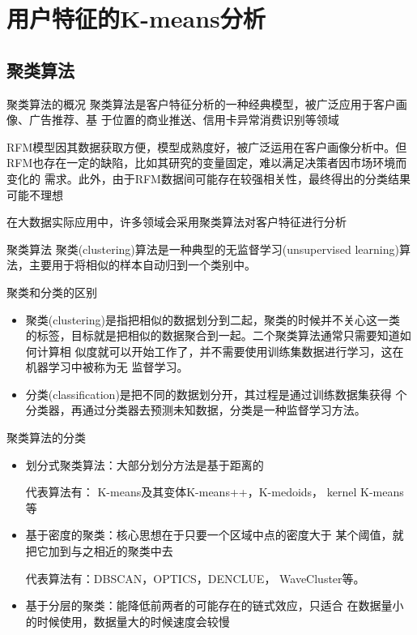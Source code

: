 \documentclass[t]{beamer}
\begin{document}
\section{用户特征的K-means分析}

\subsection{聚类算法}
\begin{frame}[fragile]{聚类算法的概况}
  聚类算法是客户特征分析的一种经典模型，被广泛应用于客户画像、广告推荐、基
  于位置的商业推送、信用卡异常消费识别等领域

  RFM模型因其数据获取方便，模型成熟度好，被广泛运用在客户画像分析中。但
  RFM也存在一定的缺陷，比如其研究的变量固定，难以满足决策者因市场环境而变化的
  需求。此外，由于RFM数据间可能存在较强相关性，最终得出的分类结果可能不理想
  
  在大数据实际应用中，许多领域会采用聚类算法对客户特征进行分析
\end{frame}


\begin{frame}[fragile]{聚类算法}
  聚类(clustering)算法是一种典型的无监督学习(unsupervised learning)算法，主要用于将相似的样本自动归到一个类别中。

  \begin{block}{聚类和分类的区别}
\begin{itemize}
  \item 聚类(clustering)是指把相似的数据划分到二起，聚类的时候并不关心这一类
    的标签，目标就是把相似的数据聚合到一起。二个聚类算法通常只需要知道如何计算相
    似度就可以开始工作了，并不需要使用训练集数据进行学习，这在机器学习中被称为{\color{blue}无
    监督学习}。
    \item 分类(classification)是把不同的数据划分开，其过程是通过训练数据集获得
    个分类器，再通过分类器去预测未知数据，分类是一种{\color{red}监督学习方法}。
\end{itemize}
  \end{block}
\end{frame}


\begin{frame}[fragile]{聚类算法的分类}
\begin{itemize}
  \item 划分式聚类算法：大部分划分方法是基于距离的
  
  代表算法有： K-means及其变体K-means++，K-medoids， kernel K-means等
  \item  基于密度的聚类：核心思想在于只要一个区域中点的密度大于 某个阈值，就把它加到与之相近的聚类中去
  
  代表算法有：DBSCAN，OPTICS，DENCLUE， WaveCluster等。
  \item 基于分层的聚类：能降低前两者的可能存在的链式效应，只适合
  在数据量小的时候使用，数据量大的时候速度会较慢
\end{itemize}
\end{frame}
\end{document}
